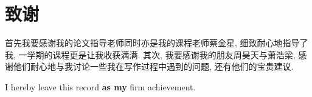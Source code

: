 \chapter{致谢}

首先我要感谢我的论文指导老师同时亦是我的课程老师蔡金星,
细致耐心地指导了我,
一学期的课程更是让我收获满满.
其次, 我要感谢我的朋友周昊天与萧浩梁,
感谢他们耐心地与我讨论一些我在写作过程中遇到的问题,
还有他们的宝贵建议.

I hereby leave this record \textbf{as my} firm achievement.
